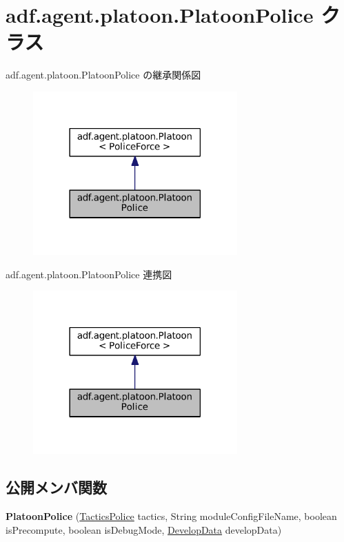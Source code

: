 \hypertarget{classadf_1_1agent_1_1platoon_1_1PlatoonPolice}{}\section{adf.\+agent.\+platoon.\+Platoon\+Police クラス}
\label{classadf_1_1agent_1_1platoon_1_1PlatoonPolice}


adf.\+agent.\+platoon.\+Platoon\+Police の継承関係図
\nopagebreak
\begin{figure}[H]
\begin{center}
\leavevmode
\includegraphics[width=222pt]{classadf_1_1agent_1_1platoon_1_1PlatoonPolice__inherit__graph}
\end{center}
\end{figure}


adf.\+agent.\+platoon.\+Platoon\+Police 連携図
\nopagebreak
\begin{figure}[H]
\begin{center}
\leavevmode
\includegraphics[width=222pt]{classadf_1_1agent_1_1platoon_1_1PlatoonPolice__coll__graph}
\end{center}
\end{figure}
\subsection*{公開メンバ関数}
\begin{DoxyCompactItemize}
\item 
\hypertarget{classadf_1_1agent_1_1platoon_1_1PlatoonPolice_a8f0ad2cab2c2274ecba2496d1b813e63}{}\label{classadf_1_1agent_1_1platoon_1_1PlatoonPolice_a8f0ad2cab2c2274ecba2496d1b813e63} 
{\bfseries Platoon\+Police} (\hyperlink{classadf_1_1component_1_1tactics_1_1TacticsPolice}{Tactics\+Police} tactics, String module\+Config\+File\+Name, boolean is\+Precompute, boolean is\+Debug\+Mode, \hyperlink{classadf_1_1agent_1_1develop_1_1DevelopData}{Develop\+Data} develop\+Data)
\end{DoxyCompactItemize}
